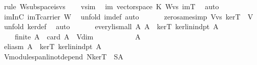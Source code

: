 \begin{isabellebody}
\ {\isacharparenleft}rule\ W{\isachardot}subspace{\isacharunderscore}is{\isacharunderscore}vs{\isacharparenright}\isanewline
\ \ \isamarkupfalse%
\ vs{\isacharunderscore}im\ \isamarkupfalse%
\ im{\isacharcolon}\ vectorspace\ K\ {\isachardoublequoteopen}{\isacharparenleft}W{\isachardot}vs\ imT{\isacharparenright}{\isachardoublequoteclose}\ \isamarkupfalse%
\ auto\isanewline
\ \ \isamarkupfalse%
\ imInC{\isacharcolon}\ {\isachardoublequoteopen}imT{\isasymsubseteq}carrier\ W{\isachardoublequoteclose}\ \isamarkupfalse%
\ {\isacharparenleft}unfold\ im{\isacharunderscore}def{\isacharcomma}\ auto{\isacharparenright}\isanewline
\ \ \isanewline
\ \ \isamarkupfalse%
\ zero{\isacharunderscore}same{\isacharbrackleft}simp{\isacharbrackright}{\isacharcolon}\ {\isachardoublequoteopen}{\isasymzero}\isactrlbsub V{\isachardot}vs\ kerT\isactrlesub \ {\isacharequal}\ {\isasymzero}\isactrlbsub V\isactrlesub {\isachardoublequoteclose}\ \isamarkupfalse%
\ {\isacharparenleft}unfold\ ker{\isacharunderscore}def{\isacharparenright}\ \isamarkupfalse%
\ auto\isanewline
\ \ %
\isanewline
\ \ \isamarkupfalse%
\ every{\isacharunderscore}li{\isacharunderscore}small{\isacharcolon}\ {\isachardoublequoteopen}{\isasymAnd}A{\isachardot}\ {\isacharparenleft}A\ {\isasymsubseteq}\ kerT{\isacharparenright}{\isasymand}\ ker{\isachardot}lin{\isacharunderscore}indpt\ A\ {\isasymLongrightarrow}\ \isanewline
\ \ \ \ finite\ A\ {\isasymand}\ card\ A\ {\isasymle}\ V{\isachardot}dim{\isachardoublequoteclose}\isanewline
\ \ \isamarkupfalse%
\ {\isacharminus}\ \isanewline
\ \ \ \ \isamarkupfalse%
\ A\isanewline
\ \ \ \ \isamarkupfalse%
\ eli{\isacharunderscore}asm{\isacharcolon}\ {\isachardoublequoteopen}{\isacharparenleft}A\ {\isasymsubseteq}\ kerT{\isacharparenright}{\isasymand}\ ker{\isachardot}lin{\isacharunderscore}indpt\ A{\isachardoublequoteclose}\isanewline
\ \ \ \ \isanewline
\ \ \ \ \isamarkupfalse%
\ V{\isachardot}module{\isachardot}span{\isacharunderscore}li{\isacharunderscore}not{\isacharunderscore}depend{\isacharparenleft}{}{\isacharparenright}{\isacharbrackleft}\ {\isacharquery}N{\isacharequal}{\isachardoublequoteopen}kerT{\isachardoublequoteclose}\ \ {\isacharquery}S{\isacharequal}{\isachardoublequoteopen}A{\isachardoublequoteclose}{\isacharbrackright}\ \isanewline

\end{isabellebody}
